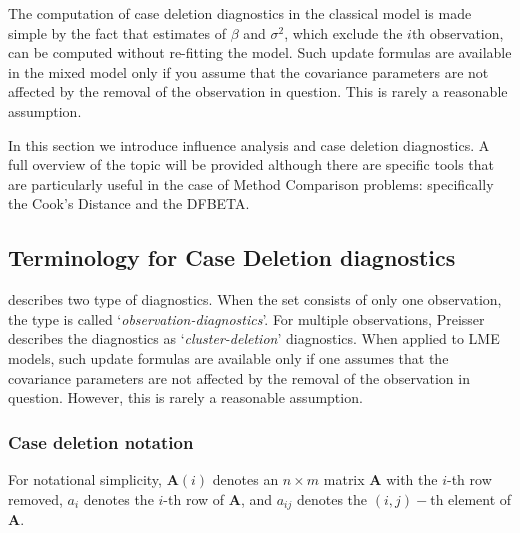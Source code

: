 \documentclass[12pt, a4paper]{report}
\theoremstyle{plain}
\theoremstyle{definition}
\theoremstyle{remark}
\begin{document}
	
	The computation of case deletion diagnostics in the classical model is made simple by the fact that estimates of $\beta$ and $\sigma^2$, which exclude the $i$th observation, can be computed without re-fitting the model. Such update formulas are available in the mixed model only if you assume that the covariance parameters are not affected by the removal of the observation in question. This is rarely a reasonable assumption.
	
	
	In this section we introduce influence analysis and case deletion diagnostics. A full overview of the topic will be provided although there are specific tools that are particularly useful in the case of Method Comparison problems: specifically the Cook's Distance and the DFBETA.
	
		
		
		\subsection{Terminology for Case Deletion diagnostics} %
		
		\citet{preisser} describes two type of diagnostics. When the set consists of only one observation, the type is called
		`\textit{observation-diagnostics}'. For multiple observations, Preisser describes the diagnostics as `\textit{cluster-deletion}' diagnostics. When applied to LME models, such update formulas are available only if one assumes that the covariance parameters are not affected by the removal of the observation in question. However, this is rarely a reasonable assumption.
		
	

\subsubsection{Case deletion notation} 
		
		For notational simplicity, $\boldsymbol{A}(i)$ denotes an $n \times m$ matrix $\boldsymbol{A}$ with the $i$-th row
		removed, $a_i$ denotes the $i$-th row of $\boldsymbol{A}$, and $a_{ij}$ denotes the $(i, j)-$th element of $\boldsymbol{A}$.
		
\end{document}
